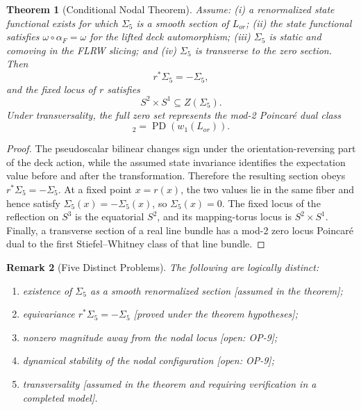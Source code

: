 \documentclass[11pt]{article}
\theoremstyle{canonmath}
\newtheorem{theorem}{Theorem}[section]
\newtheorem{remark}[theorem]{Remark}
\theoremstyle{canonpostulate}
\theoremstyle{canonclaim}
\providecommand{\Lor}{\mathcal L_{\mathrm{or}}}
\def\mathrm#1{#1}%
\def\mathcal#1{#1}%
\begin{document}
\begin{theorem}[Conditional Nodal Theorem] \label{thm:wall_zero}
Assume: (i) a renormalized state functional exists for which $\Sigma_5$ is a smooth section of $\Lor$; (ii) the state functional satisfies $\omega\circ\alpha_F=\omega$ for the lifted deck automorphism; (iii) $\Sigma_5$ is static and comoving in the FLRW slicing; and (iv) $\Sigma_5$ is transverse to the zero section. Then
\begin{equation}
r^*\Sigma_5=-\Sigma_5,
\end{equation}
and the fixed locus of $r$ satisfies
\begin{equation}
S^2\times S^1\subseteq Z(\Sigma_5).
\end{equation}
Under transversality, the full zero set represents the mod-2 Poincar\'e dual class
\begin{equation}
[Z(\Sigma_5)]_2=\operatorname{PD}\!\left(w_1(\Lor)\right).
\end{equation}
\end{theorem}
\begin{proof}
The pseudoscalar bilinear changes sign under the orientation-reversing part of the deck action, while the assumed state invariance identifies the expectation value before and after the transformation. Therefore the resulting section obeys $r^*\Sigma_5=-\Sigma_5$. At a fixed point $x=r(x)$, the two values lie in the same fiber and hence satisfy $\Sigma_5(x)=-\Sigma_5(x)$, so $\Sigma_5(x)=0$. The fixed locus of the reflection on $S^3$ is the equatorial $S^2$, and its mapping-torus locus is $S^2\times S^1$. Finally, a transverse section of a real line bundle has a mod-2 zero locus Poincar\'e dual to the first Stiefel--Whitney class of that line bundle.
\end{proof}

\begin{remark}[Five Distinct Problems]
The following are logically distinct:
\begin{enumerate}
\item existence of $\Sigma_5$ as a smooth renormalized section [assumed in the theorem];
\item equivariance $r^*\Sigma_5=-\Sigma_5$ [proved under the theorem hypotheses];
\item nonzero magnitude away from the nodal locus [open: OP-9];
\item dynamical stability of the nodal configuration [open: OP-9];
\item transversality [assumed in the theorem and requiring verification in a completed model].
\end{enumerate}
\end{remark}
\end{document}

